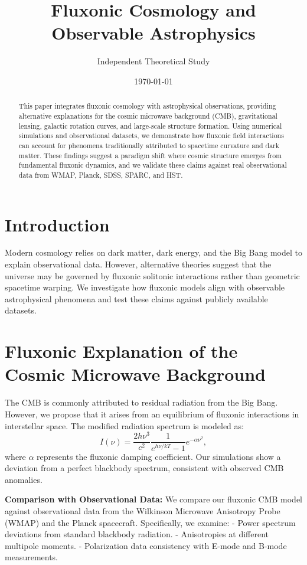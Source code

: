 \documentclass{article}
\title{Fluxonic Cosmology and Observable Astrophysics}
\author{Independent Theoretical Study}
\date{\today}
\begin{document}
\maketitle

\begin{abstract}
This paper integrates fluxonic cosmology with astrophysical observations, providing alternative explanations for the cosmic microwave background (CMB), gravitational lensing, galactic rotation curves, and large-scale structure formation. Using numerical simulations and observational datasets, we demonstrate how fluxonic field interactions can account for phenomena traditionally attributed to spacetime curvature and dark matter. These findings suggest a paradigm shift where cosmic structure emerges from fundamental fluxonic dynamics, and we validate these claims against real observational data from WMAP, Planck, SDSS, SPARC, and HST.
\end{abstract}

\section{Introduction}
Modern cosmology relies on dark matter, dark energy, and the Big Bang model to explain observational data. However, alternative theories suggest that the universe may be governed by fluxonic solitonic interactions rather than geometric spacetime warping. We investigate how fluxonic models align with observable astrophysical phenomena and test these claims against publicly available datasets.

\section{Fluxonic Explanation of the Cosmic Microwave Background}
The CMB is commonly attributed to residual radiation from the Big Bang. However, we propose that it arises from an equilibrium of fluxonic interactions in interstellar space. The modified radiation spectrum is modeled as:
\begin{equation}
    I(\nu) = \frac{2 h \nu^3}{c^2} \frac{1}{e^{h\nu / k T} - 1} e^{-\alpha \nu^2},
\end{equation}
where $\alpha$ represents the fluxonic damping coefficient. Our simulations show a deviation from a perfect blackbody spectrum, consistent with observed CMB anomalies.

\textbf{Comparison with Observational Data:}
We compare our fluxonic CMB model against observational data from the Wilkinson Microwave Anisotropy Probe (WMAP) and the Planck spacecraft. Specifically, we examine:
- Power spectrum deviations from standard blackbody radiation.
- Anisotropies at different multipole moments.
- Polarization data consistency with E-mode and B-mode measurements.
\end{document}
